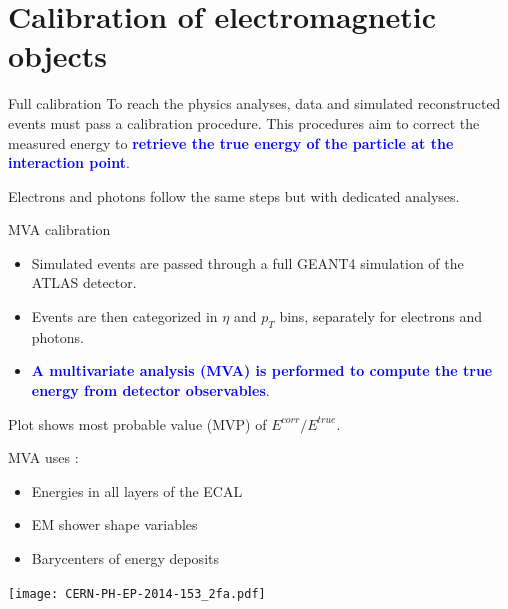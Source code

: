 \section{Calibration of electromagnetic objects}
\frame{\tableofcontents[currentsection]}
\begin{frame}{Full calibration}
  To reach the physics analyses, data and simulated reconstructed events must pass a calibration procedure.
  This procedures aim to correct the measured energy to \textcolor{blue}{\bf retrieve the true energy of the particle at the interaction point}.
  \begin{center}
  \end{center}
  Electrons and photons follow the same steps but with dedicated analyses. 
\end{frame}
\begin{frame}{MVA calibration}
\begin{itemize}
\item Simulated events are passed through a full GEANT4 simulation of the ATLAS detector.
\item Events are then categorized in $\eta$ and $p_T$ bins, separately for electrons and photons.
\item \textcolor{blue}{\bf A multivariate analysis (MVA) is performed to compute the true energy from detector observables}.
\end{itemize}
Plot shows most probable value (MVP) of $E^{corr}/E^{true}$.
  \begin{minipage}{0.49\linewidth}
    MVA uses :
    \begin{itemize}
    \item Energies in all layers of the ECAL
    \item EM shower shape variables
    \item Barycenters of energy deposits
    \end{itemize}
  \end{minipage}
  \hfill
  \begin{minipage}{0.49\linewidth}
    \texttt{[image: CERN-PH-EP-2014-153\_2fa.pdf]}
  \end{minipage}

\end{frame}
